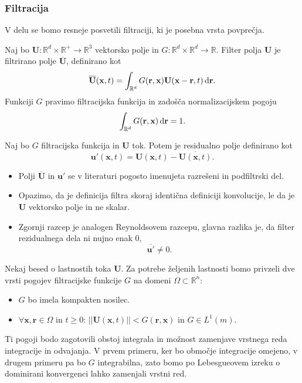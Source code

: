 \documentclass[mat2, tisk]{fmfdelo}
\newcommand{\R}{\mathbb R}
\newcommand{\bd}{\textbf}
\begin{document}
\subsubsection{Filtracija}

V delu se bomo resneje posvetili filtraciji, ki je posebna vrsta povprečja.
\begin{definicija}
Naj bo $\bd{U}: \R^d\times \R^+ \rightarrow \R^3$ vektorsko polje in $G: \R^d\times \R^d \rightarrow \R$.
Filter polja $\bd{U}$ je filtrirano polje $\overline{\bd{U}}$, definirano kot
\begin{equation*}
\overline{\bd{U}}(\bd{x}, t) = \int_{\R^d} G(\bd{r}, \bd{x})\bd{U}(\bd{x}-\bd{r}, t) \dif \bd{r}.
\end{equation*}
Funkciji $G$ pravimo filtracijska funkcija in zadošča normalizacijskem pogoju 
\begin{equation}
\label{renormal}
\int_{\R^d} G(\bd{r}, \bd{x}) \dif\bd{r} = 1.
\end{equation}
\end{definicija}

\begin{definicija}
Naj bo $G$ filtracijska funkcija in $\bd{U}$ tok. Potem je residualno polje definirano kot
\begin{equation*}
\bd{u}'(\bd{x}, t) = \bd{U}(\bd{x}, t) - \overline{\bd{U}(\bd{x}, t)}.
\end{equation*}
\end{definicija}

\begin{opomba}
\label{konvergenca filtra}
\hfill
\begin{itemize}
\item Polji $\overline{\bd{U}}$ in $\bd{u}'$ se v literaturi pogosto imenujeta razrešeni in podfiltrski del.
\item Opazimo, da je definicija filtra skoraj identična definiciji konvolucije, le da je  
$\bd{U}$ vektorsko polje in ne skalar.
\item Zgornji razcep je analogen Reynoldsovem razcepu, glavna razlika je, da filter rezidualnega
dela ni nujno enak $0$,
$$ \overline{\bd{u}'} \neq 0.$$
\end{itemize}
\end{opomba}

\begin{opomba}
Nekaj besed o lastnostih toka $\bd{U}$. Za potrebe željenih lastnosti
bomo privzeli dve vrsti pogojev filtracijske funkcije $G$ na domeni $\Omega \subset \R^n$:
\hfill
\begin{itemize}
\item $G$ bo imela kompakten nosilec.
\item $\forall \bd{x}, \bd{r} \in \Omega$ in $t\geq0$: $||\bd{U}(\bd{x}, t)|| < G(\bd{r}, \bd{x})$ in $G \in L^1(m)$.
\end{itemize}
Ti pogoji bodo zagotovili obstoj integrala in možnost zamenjave vrstnega reda integracije in odvajanja.
V prvem primeru, ker bo območje integracije omejeno, v drugem primeru pa bo 
$G$ integrabilna, zato bomo po Lebesgueovem izreku o dominirani konvergenci lahko zamenjali vrstni red.
\end{opomba}
\end{document}
